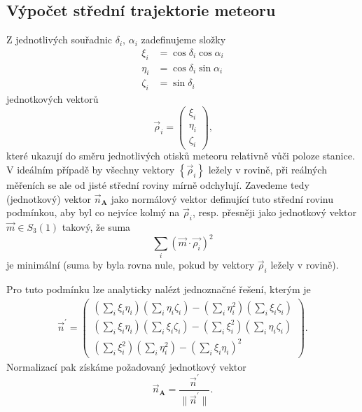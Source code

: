 \subsection{Výpočet střední trajektorie meteoru}
Z jednotlivých souřadnic $\delta_i,\,\alpha_i$ zadefinujeme složky
\begin{equation}
    \begin{aligned}
        \xi_i   & =\cos{\delta_i}\cos{\alpha_i} \\
        \eta_i  & =\cos{\delta_i}\sin{\alpha_i} \\
        \zeta_i & =\sin{\delta_i}
    \end{aligned}
\end{equation}
jednotkových vektorů
$$
    \vec{\rho}_i=\begin{pmatrix}
        \xi_i \\\eta_i\\\zeta_i
    \end{pmatrix}\text{,}
$$
které ukazují do směru jednotlivých otisků meteoru relativně vůči poloze stanice. V ideálním případě by všechny vektory $\left\{\vec{\rho}_i\right\}$ ležely v rovině, při reálných měřeních se ale od jisté střední roviny mírně odchylují. Zavedeme tedy (jednotkový) vektor $\vec{n}_\mathbf{A}$ jako normálový vektor definující tuto střední rovinu podmínkou, aby byl co nejvíce kolmý na $\vec{\rho}_i$, resp. přesněji jako jednotkový vektor $\vec{m}\in S_3(1)$ takový, že suma
$$
    \sum_{i}{\left( \vec{m}\cdot\vec{\rho_i} \right)^2}
$$
je minimální \cite{ceplecha} (suma by byla rovna nule, pokud by vektory $\vec{\rho}_i$ ležely v rovině).

Pro tuto podmínku lze analyticky nalézt jednoznačné řešení, kterým je \cite{ceplecha}
\begin{equation}
    \begin{aligned}
        \vec{n}^\prime=\begin{pmatrix}
                           \left( \sum_{i}{\xi_i\eta_i} \right)\left( \sum_{i}{\eta_i\zeta_i} \right)-\left( \sum_{i}{\eta_i^2} \right)\left( \sum_{i}{\xi_i\zeta_i} \right) \\
                           \left( \sum_{i}{\xi_i\eta_i} \right)\left( \sum_{i}{\xi_i\zeta_i} \right)-\left( \sum_{i}{\xi_i^2} \right)\left( \sum_{i}{\eta_i\zeta_i} \right)  \\
                           \left( \sum_{i}{\xi_i^2} \right)\left( \sum_{i}{\eta_i^2} \right)-\left( \sum_{i}{\xi_i\eta_i} \right)^2
                       \end{pmatrix}\text{.}
    \end{aligned}
\end{equation}
Normalizací pak získáme požadovaný jednotkový vektor
\begin{equation}
    \vec{n}_\mathbf{A}=\frac{\vec{n}^\prime}{\lVert \vec{n}^\prime \rVert }\text{.}
\end{equation}

